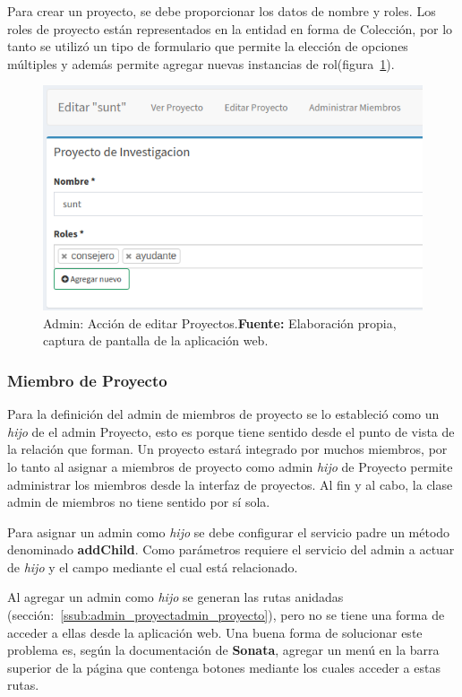 Para crear un proyecto, se debe proporcionar los datos de nombre y roles. Los roles de proyecto están representados en la entidad en forma de Colección,
por lo tanto se utilizó un tipo de formulario que permite la elección de opciones múltiples y además permite agregar nuevas instancias de
rol(figura~\ref{fig:image/proyecto-editar}).

\begin{figure}[h]
    \includegraphics[width=1\linewidth]{image/proyecto-editar.png}
    \caption{Admin: Acción de  editar Proyectos.\newline \textbf{Fuente:} Elaboración propia, captura de pantalla de la aplicación web.}
    \label{fig:image/proyecto-editar}
\end{figure}

\subsubsection{Miembro de Proyecto}%
\label{ssub:miembro_de_proyecto_admin}
Para la definición del admin de miembros de proyecto se lo estableció como un \textit{hijo} de el admin Proyecto, esto es porque tiene sentido desde el punto de vista
de la relación que forman. Un proyecto estará integrado por muchos miembros, por lo tanto al asignar a miembros de proyecto como admin \textit{hijo} de Proyecto permite
administrar los miembros desde la interfaz de proyectos. Al fin y al cabo, la clase admin de miembros no tiene sentido por sí sola.

Para asignar un admin como \textit{hijo} se debe configurar el servicio padre un método denominado \textbf{addChild}. Como parámetros requiere el servicio del admin
a actuar de \textit{hijo} y el campo mediante el cual está relacionado.


Al agregar un admin como \textit{hijo} se generan las rutas anidadas (sección:~\ref{ssub:admin_proyectadmin_proyecto}), pero no se tiene una forma de acceder a
ellas desde la aplicación web\@. Una buena forma de solucionar este problema es, según la documentación de \textbf{Sonata}, agregar un menú en la barra superior
de la página que contenga botones mediante los cuales acceder a estas rutas.\textcite{sonata-childAdmin}

